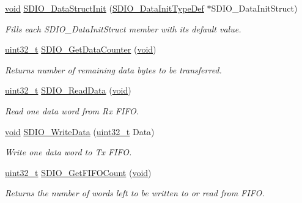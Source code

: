 \begin{DoxyCompactItemize}
\hyperlink{usb__devapi_8h_afabf60e7f57651d6d595a02c75f07cd0}{void} \hyperlink{group___s_d_i_o___exported___functions_gaa83209c09e921521aca2587fb5b22ea2}{S\+D\+I\+O\+\_\+\+Data\+Struct\+Init} (\hyperlink{struct_s_d_i_o___data_init_type_def}{S\+D\+I\+O\+\_\+\+Data\+Init\+Type\+Def} $\ast$S\+D\+I\+O\+\_\+\+Data\+Init\+Struct)
\begin{DoxyCompactList}\small\item\em Fills each S\+D\+I\+O\+\_\+\+Data\+Init\+Struct member with its default value. \end{DoxyCompactList}\item 
\hyperlink{_p_e___types_8h_a33594304e786b158f3fb30289278f5af}{uint32\+\_\+t} \hyperlink{group___s_d_i_o___exported___functions_ga7a28aaa2c25a9a5a8db1f49b0e8c9d0a}{S\+D\+I\+O\+\_\+\+Get\+Data\+Counter} (\hyperlink{usb__devapi_8h_afabf60e7f57651d6d595a02c75f07cd0}{void})
\begin{DoxyCompactList}\small\item\em Returns number of remaining data bytes to be transferred. \end{DoxyCompactList}\item 
\hyperlink{_p_e___types_8h_a33594304e786b158f3fb30289278f5af}{uint32\+\_\+t} \hyperlink{group___s_d_i_o___exported___functions_ga4e8ac755ef3c31ecd4ed2708df19187e}{S\+D\+I\+O\+\_\+\+Read\+Data} (\hyperlink{usb__devapi_8h_afabf60e7f57651d6d595a02c75f07cd0}{void})
\begin{DoxyCompactList}\small\item\em Read one data word from Rx F\+I\+FO. \end{DoxyCompactList}\item 
\hyperlink{usb__devapi_8h_afabf60e7f57651d6d595a02c75f07cd0}{void} \hyperlink{group___s_d_i_o___exported___functions_ga361008b5252aa33b5f2b5823ee3d7240}{S\+D\+I\+O\+\_\+\+Write\+Data} (\hyperlink{_p_e___types_8h_a33594304e786b158f3fb30289278f5af}{uint32\+\_\+t} Data)
\begin{DoxyCompactList}\small\item\em Write one data word to Tx F\+I\+FO. \end{DoxyCompactList}\item 
\hyperlink{_p_e___types_8h_a33594304e786b158f3fb30289278f5af}{uint32\+\_\+t} \hyperlink{group___s_d_i_o___exported___functions_ga9a3343983a2d68b5164a1c89797d2dd6}{S\+D\+I\+O\+\_\+\+Get\+F\+I\+F\+O\+Count} (\hyperlink{usb__devapi_8h_afabf60e7f57651d6d595a02c75f07cd0}{void})
\begin{DoxyCompactList}\small\item\em Returns the number of words left to be written to or read from F\+I\+FO. \end{DoxyCompactList}\item 

\end{DoxyCompactItemize}
